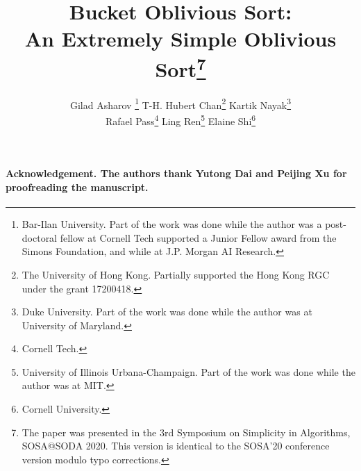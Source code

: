 \documentclass[11pt,letterpaper]{article}
\theoremstyle{boxes}
\begin{document}
\title{\bf Bucket Oblivious Sort: \\An Extremely Simple Oblivious Sort\thanks{The paper was presented in the 3rd Symposium on Simplicity in Algorithms, SOSA@SODA 2020. This version is identical
to the SOSA'20 conference version modulo typo corrections.
}}

\author{Gilad Asharov \thanks{Bar-Ilan University. Part of the work was done while the author was a post-doctoral fellow at Cornell Tech supported a Junior Fellow award from the Simons Foundation, and while at J.P. Morgan AI Research.} \qquad
T-H. Hubert Chan\thanks{The University of Hong Kong. Partially supported the Hong Kong RGC under the grant 17200418.} \qquad
Kartik Nayak\thanks{Duke University. Part of the work was done while the author was at University of Maryland.} \\
Rafael Pass\thanks{Cornell Tech.} \qquad
Ling Ren\thanks{University of Illinois Urbana-Champaign. Part of the work was done while the author was at MIT.} \qquad
Elaine Shi\thanks{Cornell University.}}

\newcommand{\rl}[1]{{\footnotesize\color{orange}[Ling: #1]}}

\date{}

\maketitle


\begin{abstract}

\end{abstract}






\paragraph{Acknowledgement. The authors thank Yutong Dai and Peijing Xu for proofreading the manuscript.}



%


\appendix

%
\end{document}

